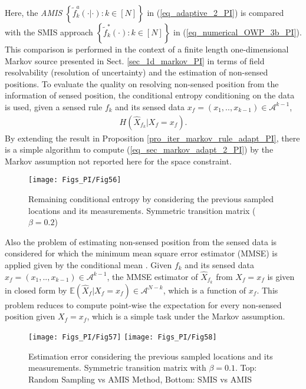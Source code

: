 Here, the \emph{AMIS} $\left\{\right.\tilde{f}^a_k(\cdot | \cdot): k \in [N] \left.\right\}$ in  (\ref{eq_adaptive_2_PI}) is compared with the SMIS approach $\left\{\right. \tilde{f}^*_k(\cdot):k \in [N] \left.\right\}$ in (\ref{eq_numerical_OWP_3b_PI}). This comparison is performed in  the context of a finite length one-dimensional Markov source presented in Sect. \ref{sec_1d_markov_PI} in terms of field resolvability (resolution of uncertainty) and  the estimation of non-sensed positions.
To evaluate the quality on resolving non-sensed position from the information of sensed position, the conditional entropy conditioning on the data is used, given a sensed rule $f_k$ and its sensed data $x_f=(x_1,..,x_{k-1})\in \mathcal{A}^{k-1}$,
\begin{align}\label{eq_sec_markov_adapt_2_PI}
H( \hat{X}_{f_k} | X_{f} = x_{f}). 
\end{align}
By extending the result in Proposition \ref{pro_iter_markov_rule_adapt_PI}, there is a simple algorithm to compute (\ref{eq_sec_markov_adapt_2_PI}) by the Markov assumption not reported here for the space constraint. 

\begin{figure}
    \centering
    \texttt{[image: Figs\_PI/Fig56]}
	\caption[Remaining conditional entropy for symmetric transition matrix ($\beta = 0.2$)]{\label{fig:perfADA_2_PI} Remaining conditional entropy by considering the previous sampled locations and its measurements. Symmetric transition matrix ($\beta = 0.2$) }
\end{figure}

Also the problem of estimating non-sensed position from the sensed data is considered for which the minimum mean square error estimator (MMSE) is applied given by the conditional mean \citep{gray_2004}. Given $f_k$ and its sensed data $x_f=(x_1,..,x_{k-1})\in \mathcal{A}^{k-1}$, the MMSE estimator of $\hat{X}_{f_k}$ from $X_f=x_f$ is given in closed form by $\mathbb{E} ({\hat{X}_f| X_f=x_f})\in \mathcal{A}^{N-k}$, which is a function of $x_f$. {This problem reduces to compute point-wise the expectation for every non-sensed position given $X_f=x_f$, which is a simple task under the Markov assumption.} 

\begin{figure}
    \centering
    \texttt{[image: Figs\_PI/Fig57]}
    \texttt{[image: Figs\_PI/Fig58]}
	\caption[Estimation error for symmetric transition matrix with $\beta = 0.1$]{\label{fig:perfADA_3_PI} Estimation error considering the previous sampled locations and its measurements. Symmetric transition matrix with $\beta = 0.1$. Top: Random Sampling vs AMIS Method, Bottom: SMIS vs AMIS}
\end{figure}

